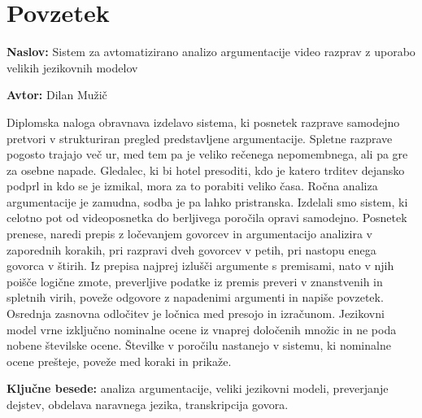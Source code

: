 \documentclass[a4paper, 12pt]{book}
\newcommand{\ttitle}{Sistem za avtomatizirano analizo argumentacije video razprav z uporabo velikih jezikovnih modelov}
\newcommand{\tauthor}{Dilan Mužič}
\newcommand{\tkeywords}{analiza argumentacije, veliki jezikovni modeli, preverjanje dejstev, obdelava naravnega jezika, transkripcija govora}
\newcommand{\clearemptydoublepage}{\newpage{\pagestyle{empty}\cleardoublepage}}
\begin{document}
\rm\normalfont
\clearemptydoublepage



\pagestyle{empty}
\def\thepage{}
\tableofcontents{}

\clearemptydoublepage


\chapter*{Povzetek}

\noindent\textbf{Naslov:} \ttitle
\bigskip

\noindent\textbf{Avtor:} \tauthor
\bigskip

\noindent
Diplomska naloga obravnava izdelavo sistema, ki
posnetek razprave samodejno pretvori v strukturiran pregled predstavljene argumentacije. Spletne razprave pogosto trajajo več ur, med tem pa je veliko rečenega nepomembnega, ali pa gre za osebne napade. Gledalec, ki bi hotel presoditi, kdo je katero trditev dejansko podprl in kdo se je izmikal, mora za to porabiti veliko časa. Ročna analiza argumentacije je zamudna, sodba je pa lahko pristranska. Izdelali smo sistem, ki celotno pot od videoposnetka do berljivega poročila opravi samodejno. Posnetek prenese, naredi prepis z ločevanjem govorcev in argumentacijo analizira v zaporednih korakih, pri razpravi dveh govorcev v petih, pri nastopu enega govorca v štirih. Iz prepisa najprej izlušči argumente s premisami, nato v njih poišče logične zmote, preverljive podatke iz premis preveri v znanstvenih in spletnih virih, poveže odgovore z napadenimi argumenti in napiše povzetek. Osrednja zasnovna odločitev je ločnica med presojo in izračunom. Jezikovni model vrne izključno nominalne ocene iz vnaprej določenih množic in ne poda nobene številske ocene. Številke v poročilu nastanejo v sistemu, ki nominalne ocene prešteje, poveže med koraki in prikaže.

\bigskip

\noindent\textbf{Ključne besede:} \tkeywords.
\clearemptydoublepage

\end{document}
